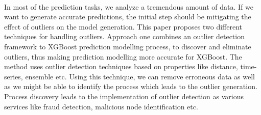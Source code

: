 \documentclass[runningheads]{llncs}
\begin{document}
\paragraph{} In most of the prediction tasks, we analyze a tremendous amount of data. If we want to generate accurate predictions, the initial step should be mitigating the effect of outliers on the model generation. This paper proposes two different techniques for handling outliers. Approach one combines an outlier detection framework to XGBoost prediction modelling process, to discover and eliminate outliers, thus making prediction modelling more accurate for XGBoost. The method uses outlier detection techniques based on properties like distance, time-series, ensemble etc. Using this technique, we can remove erroneous data as well as we might be able to identify the process which leads to the outlier generation. Process discovery leads to the implementation of outlier detection as various services like fraud detection, malicious node identification etc. 


\end{document}

